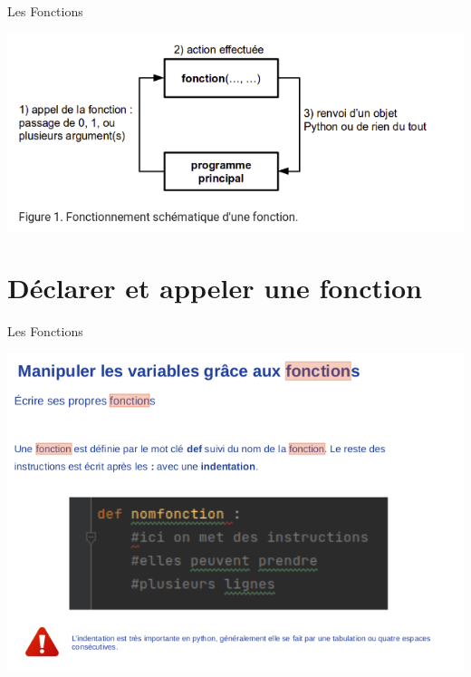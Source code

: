 \begin{frame}{Les Fonctions}

\includegraphics[scale=0.5]{images/fonctions.png}
    
\end{frame}

\section{Déclarer et appeler une fonction}

\begin{frame}{Les Fonctions}

\includegraphics[scale=0.5]{images/fonction_2.png}
    
\end{frame}

